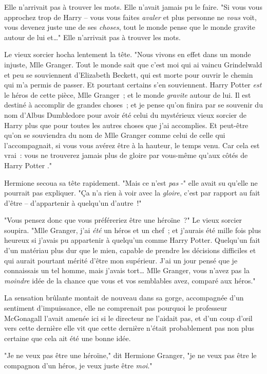 Elle n'arrivait pas à trouver les mots. Elle n'avait jamais pu le faire. "Si vous vous approchez trop de Harry -- vous vous faites \emph{avaler} et plus personne ne \emph{vous} voit, vous devenez juste une de ses \emph{choses}, tout le monde pense que le monde gravite autour de lui et…" Elle n'arrivait pas à trouver les mots.

Le vieux sorcier hocha lentement la tête. "Nous vivons en effet dans un monde injuste, Mlle Granger. Tout le monde sait que c'est moi qui ai vaincu Grindelwald et peu se souviennent d'Elizabeth Beckett, qui est morte pour ouvrir le chemin qui m'a permis de passer. Et pourtant certains s'en souviennent. Harry Potter \emph{est} le héros de cette pièce, Mlle Granger~; et le monde \emph{gravite} autour de lui. Il est destiné à accomplir de grandes choses~; et je pense qu'on finira par se souvenir du nom d'Albus Dumbledore pour avoir été celui du mystérieux vieux sorcier de Harry plus que pour toutes les autres choses que j'ai accomplies. Et peut-être qu'on se souviendra du nom de Mlle Granger comme celui de celle qui l'accompagnait, si vous vous avérez être à la hauteur, le temps venu. Car cela est vrai~: vous ne trouverez jamais plus de gloire par vous-même qu'aux côtés de Harry Potter ."

Hermione secoua sa tête rapidement. "Mais ce n'est \emph{pas} -" elle avait su qu'elle ne pourrait pas expliquer. "Ça n'a rien à voir avec la \emph{gloire}, c'est par rapport au fait d'être -- d'appartenir à quelqu'un d'autre~!"

"Vous pensez donc que vous préféreriez être une héroïne~?" Le vieux sorcier soupira. "Mlle Granger, j'ai \emph{été} un héros et un chef~; et j'aurais été mille fois plus heureux si j'avais pu appartenir à quelqu'un comme Harry Potter. Quelqu'un fait d'un matériau plus dur que le mien, capable de prendre les décisions difficiles et qui aurait pourtant mérité d'être mon supérieur. J'ai un jour pensé que je connaissais un tel homme, mais j'avais tort… Mlle Granger, vous n'avez pas la \emph{moindre} idée de la chance que vous et vos semblables avez, comparé aux héros."

La sensation brûlante montait de nouveau dans sa gorge, accompagnée d'un sentiment d'impuissance, elle ne comprenait pas pourquoi le professeur McGonagall l'avait amenée ici si le directeur ne l'aidait pas, et d'un coup d'œil vers cette dernière elle vit que cette dernière n'était probablement pas non plus certaine que cela ait été une bonne idée.

"Je ne veux pas être une héroïne," dit Hermione Granger, "je ne veux pas être le compagnon d'un héros, je veux juste être \emph{moi}."

